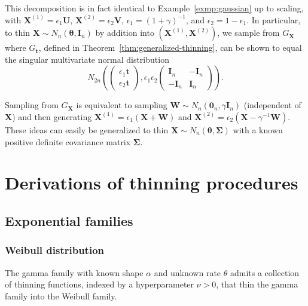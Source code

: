 \documentclass[12pt]{article}
\begin{document}
This decomposition is in fact identical to Example~\ref{exmp:gaussian} up to scaling, with $\mathbf{X}^{(1)}=\epsilon_1\mathbf{U}$, $\mathbf{X}^{(2)}=\epsilon_2\mathbf{V}$, $\epsilon_1=(1+\gamma)^{-1}$, and $\epsilon_2=1-\epsilon_1$.
In particular, to thin $\mathbf{X} \sim N_n(\boldsymbol\theta, \mathbf{I}_n)$ by addition into $(\mathbf{X}^{(1)},\mathbf{X}^{(2)})$, we sample from $G_{\mathbf{X}}$ where $G_{\mathbf{t}}$, defined in Theorem~\ref{thm:generalized-thinning}, can be shown to equal the singular multivariate normal distribution
$$
N_{2n}\left(\begin{pmatrix}\epsilon_1\mathbf{t}\\ \epsilon_2\mathbf{t}\end{pmatrix},\epsilon_1\epsilon_2\begin{pmatrix}\mathbf{I}_n&-\mathbf{I}_n\\-\mathbf{I}_n&\mathbf{I}_n\end{pmatrix}\right).
$$

Sampling from $G_{\mathbf{X}}$ is equivalent to sampling $\mathbf{W} \sim N_n(\mathbf{0}_n, \gamma \mathbf{I}_n)$ (independent of $\mathbf{X}$) and then generating $\mathbf{X}^{(1)} = \epsilon_1 (\mathbf{X} + \mathbf{W})$ and $\mathbf{X}^{(2)} = \epsilon_2 (\mathbf{X} - \gamma^{-1} \mathbf{W})$.
These ideas can easily be generalized to thin $\mathbf{X} \sim N_n(\boldsymbol\theta, \boldsymbol\Sigma)$ with a known positive definite covariance matrix $\boldsymbol\Sigma$.



\section{Derivations of thinning procedures} \label{sec:derivations}

\subsection{Exponential families}

\subsubsection{Weibull distribution}
\label{subsec:weibull-proofs}

The gamma family with known shape $\alpha$ and unknown rate $\theta$ admits a collection of thinning functions, indexed by a hyperparameter $\nu>0$, that thin the gamma family into the Weibull family.
\end{document}
